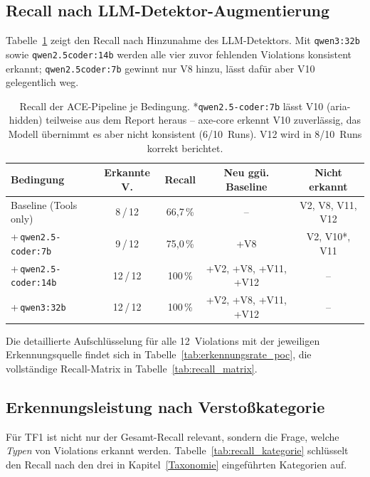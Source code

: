 \subsection{Recall nach \ac{LLM}-Detektor-Augmentierung}
\label{sec:recall_llm}

Tabelle~\ref{tab:recall_modellvergleich} zeigt den Recall nach Hinzunahme des \ac{LLM}-Detektors. Mit \texttt{qwen3:32b} sowie \texttt{qwen2.5\-coder:14b} werden alle vier zuvor fehlenden Violations konsistent erkannt; \texttt{qwen2.5\-coder:7b} gewinnt nur V8 hinzu, lässt dafür aber V10 gelegentlich weg.

\begin{table}[htbp]
\centering
\small
\renewcommand{\arraystretch}{1.15}
\begin{tabular}{@{}lcccc@{}}
\toprule
\textbf{Bedingung} & \textbf{Erkannte V.} & \textbf{Recall} & \textbf{Neu ggü. Baseline} & \textbf{Nicht erkannt} \\
\midrule
Baseline (Tools only)          & 8\,/\,12  & 66,7\,\% & --                          & V2, V8, V11, V12 \\
+\,\texttt{qwen2.5-coder:7b}   & 9\,/\,12  & 75,0\,\% & +V8                         & V2, V10*, V11 \\
+\,\texttt{qwen2.5-coder:14b}  & 12\,/\,12 & 100\,\%  & +V2, +V8, +V11, +V12        & -- \\
+\,\texttt{qwen3:32b}          & 12\,/\,12 & 100\,\%  & +V2, +V8, +V11, +V12        & -- \\
\bottomrule
\end{tabular}
\caption[Recall-Vergleich je Bedingung und Modell]{Recall der ACE-Pipeline je Bedingung. *\texttt{qwen2.5-coder:7b} lässt V10 (aria-hidden) teilweise aus dem Report heraus -- axe-core erkennt V10 zuverlässig, das Modell übernimmt es aber nicht konsistent (6/10~Runs). V12 wird in 8/10~Runs korrekt berichtet.}
\label{tab:recall_modellvergleich}
\end{table}

Die detaillierte Aufschlüsselung für alle 12~Violations mit der jeweiligen Erkennungsquelle findet sich in Tabelle~\ref{tab:erkennungsrate_poc}, die vollständige Recall-Matrix in Tabelle~\ref{tab:recall_matrix}.

\subsection{Erkennungsleistung nach Verstoßkategorie}
\label{sec:recall_kategorie}

Für TF1 ist nicht nur der Gesamt-Recall relevant, sondern die Frage, welche \textit{Typen} von Violations erkannt werden. Tabelle~\ref{tab:recall_kategorie} schlüsselt den Recall nach den drei in Kapitel~\ref{Taxonomie} eingeführten Kategorien auf.

